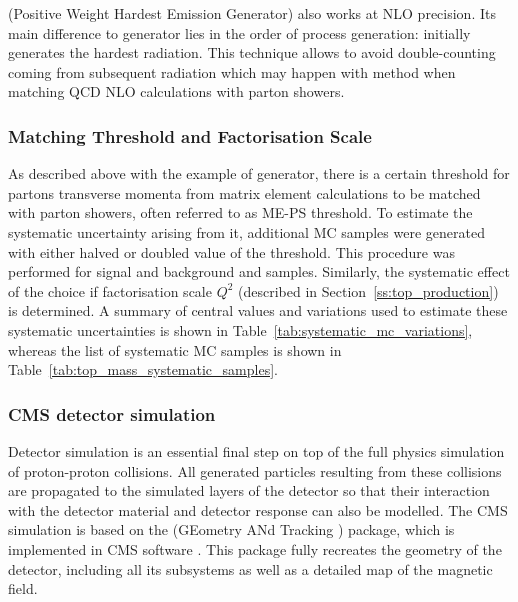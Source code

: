 \begin{description}[wide=\parindent, style=standard, labelsep=0pt]
\item [\POWHEG] (Positive Weight Hardest Emission Generator) \autocite{POWHEG} also works at NLO precision. Its main
difference to \MCATNLO generator lies in the order of process generation: \POWHEG initially generates the hardest
radiation. This technique allows to avoid double-counting coming from subsequent radiation which may happen with
\MCATNLO method when matching QCD NLO calculations with parton showers.

\end{description}

\subsubsection{Matching Threshold and Factorisation Scale}
\label{ss:matching_and_factorisation}

As described above with the example of \MADGRAPH generator, there is a certain threshold for partons transverse momenta
from matrix element calculations to be matched with parton showers, often referred to as ME-PS threshold. To estimate
the systematic uncertainty arising from it, additional MC samples were generated with either halved or doubled value of
the threshold. This procedure was performed for signal \ttjets and background \WpJets and \ZpJets samples. Similarly,
the systematic effect of the choice if factorisation scale $Q^2$ (described in Section~\ref{ss:top_production}) is
determined. A summary of central values and variations used to estimate these systematic uncertainties is shown in
Table~\ref{tab:systematic_mc_variations}, whereas the list of systematic MC samples is shown in
Table~\ref{tab:top_mass_systematic_samples}.



\subsubsection{CMS detector simulation}

Detector simulation is an essential final step on top of the full physics simulation of proton-proton collisions. All
generated particles resulting from these collisions are propagated to the simulated layers of the detector so that their
interaction with the detector material and detector response can also be modelled. The CMS simulation is based on the
\GEANTfour (GEometry ANd Tracking \autocite{GEANT4}) package, which is implemented in CMS software \CMSSW
\autocite{CMSSW}. This package fully recreates the geometry of the detector, including all its subsystems as well as a
detailed map of the magnetic field.

